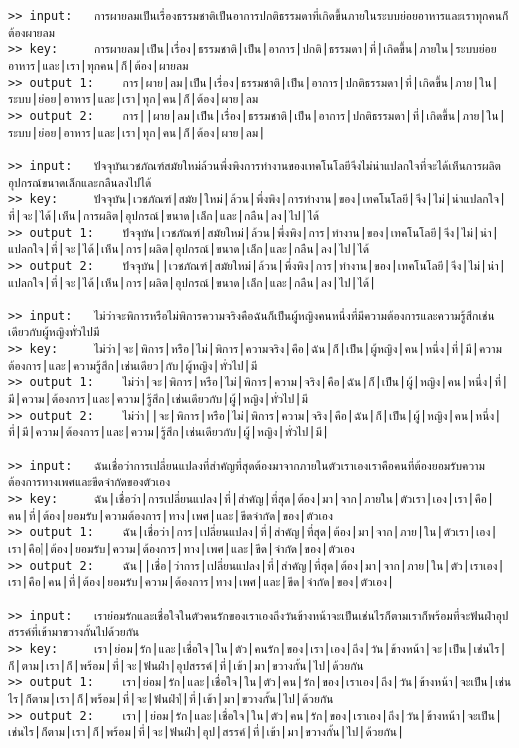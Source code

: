 \documentclass[11pt]{article}
\begin{document}
\begin{Verbatim}[commandchars=\\\{\}]
>> input:	การผายลมเป็นเรื่องธรรมชาติเป็นอาการปกติธรรมดาที่เกิดขึ้นภายในระบบย่อยอาหารและเราทุกคนก็ต้องผายลม
>> key:		การผายลม|เป็น|เรื่อง|ธรรมชาติ|เป็น|อาการ|ปกติ|ธรรมดา|ที่|เกิดขึ้น|ภายใน|ระบบย่อยอาหาร|และ|เรา|ทุกคน|ก็|ต้อง|ผายลม
>> output 1:	การ|ผาย|ลม|เป็น|เรื่อง|ธรรมชาติ|เป็น|อาการ|ปกติธรรมดา|ที่|เกิดขึ้น|ภาย|ใน|ระบบ|ย่อย|อาหาร|และ|เรา|ทุก|คน|ก็|ต้อง|ผาย|ลม
>> output 2:	การ||ผาย|ลม|เป็น|เรื่อง|ธรรมชาติ|เป็น|อาการ|ปกติธรรมดา|ที่|เกิดขึ้น|ภาย|ใน|ระบบ|ย่อย|อาหาร|และ|เรา|ทุก|คน|ก็|ต้อง|ผาย|ลม|

>> input:	ปัจจุบันเวชภัณฑ์สมัยใหม่ล้วนพึ่งพิงการทำงานของเทคโนโลยีจึงไม่น่าแปลกใจที่จะได้เห็นการผลิตอุปกรณ์ขนาดเล็กและกลืนลงไปได้
>> key:		ปัจจุบัน|เวชภัณฑ์|สมัย|ใหม่|ล้วน|พึ่งพิง|การทำงาน|ของ|เทคโนโลยี|จึง|ไม่|น่าแปลกใจ|ที่|จะ|ได้|เห็น|การผลิต|อุปกรณ์|ขนาด|เล็ก|และ|กลืน|ลง|ไป|ได้
>> output 1:	ปัจจุบัน|เวชภัณฑ์|สมัยใหม่|ล้วน|พึ่งพิง|การ|ทำงาน|ของ|เทคโนโลยี|จึง|ไม่|น่า|แปลกใจ|ที่|จะ|ได้|เห็น|การ|ผลิต|อุปกรณ์|ขนาด|เล็ก|และ|กลืน|ลง|ไป|ได้
>> output 2:	ปัจจุบัน||เวชภัณฑ์|สมัยใหม่|ล้วน|พึ่งพิง|การ|ทำงาน|ของ|เทคโนโลยี|จึง|ไม่|น่า|แปลกใจ|ที่|จะ|ได้|เห็น|การ|ผลิต|อุปกรณ์|ขนาด|เล็ก|และ|กลืน|ลง|ไป|ได้|

>> input:	ไม่ว่าจะพิการหรือไม่พิการความจริงคือฉันก็เป็นผู้หญิงคนหนึ่งที่มีความต้องการและความรู้สึกเช่นเดียวกับผู้หญิงทั่วไปมี
>> key:		ไม่ว่า|จะ|พิการ|หรือ|ไม่|พิการ|ความจริง|คือ|ฉัน|ก็|เป็น|ผู้หญิง|คน|หนึ่ง|ที่|มี|ความต้องการ|และ|ความรู้สึก|เช่นเดียว|กับ|ผู้หญิง|ทั่วไป|มี
>> output 1:	ไม่ว่า|จะ|พิการ|หรือ|ไม่|พิการ|ความ|จริง|คือ|ฉัน|ก็|เป็น|ผู้|หญิง|คน|หนึ่ง|ที่|มี|ความ|ต้องการ|และ|ความ|รู้สึก|เช่นเดียวกับ|ผู้|หญิง|ทั่วไป|มี
>> output 2:	ไม่ว่า||จะ|พิการ|หรือ|ไม่|พิการ|ความ|จริง|คือ|ฉัน|ก็|เป็น|ผู้|หญิง|คน|หนึ่ง|ที่|มี|ความ|ต้องการ|และ|ความ|รู้สึก|เช่นเดียวกับ|ผู้|หญิง|ทั่วไป|มี|

>> input:	ฉันเชื่อว่าการเปลี่ยนแปลงที่สำคัญที่สุดต้องมาจากภายในตัวเราเองเราคือคนที่ต้องยอมรับความต้องการทางเพศและขีดจำกัดของตัวเอง
>> key:		ฉัน|เชื่อว่า|การเปลี่ยนแปลง|ที่|สำคัญ|ที่สุด|ต้อง|มา|จาก|ภายใน|ตัวเรา|เอง|เรา|คือ|คน|ที่|ต้อง|ยอมรับ|ความต้องการ|ทาง|เพศ|และ|ขีดจำกัด|ของ|ตัวเอง
>> output 1:	ฉัน|เชื่อว่า|การ|เปลี่ยนแปลง|ที่|สำคัญ|ที่สุด|ต้อง|มา|จาก|ภาย|ใน|ตัวเรา|เอง|เรา|คือ|่|ต้อง|ยอมรับ|ความ|ต้องการ|ทาง|เพศ|และ|ขีด|จำกัด|ของ|ตัวเอง
>> output 2:	ฉัน||เชื่อ|ว่าการ|เปลี่ยนแปลง|ที่|สำคัญ|ที่สุด|ต้อง|มา|จาก|ภาย|ใน|ตัว|เราเอง|เรา|คือ|คน|ที่|ต้อง|ยอมรับ|ความ|ต้องการ|ทาง|เพศ|และ|ขีด|จำกัด|ของ|ตัวเอง|

>> input:	เราย่อมรักและเชื่อใจในตัวคนรักของเราเองถึงวันข้างหน้าจะเป็นเช่นไรก็ตามเราก็พร้อมที่จะฟันฝ่าอุปสรรค์ที่เข้ามาขวางกั้นไปด้วยกัน
>> key:		เรา|ย่อม|รัก|และ|เชื่อใจ|ใน|ตัว|คนรัก|ของ|เรา|เอง|ถึง|วัน|ข้างหน้า|จะ|เป็น|เช่นไร|ก็|ตาม|เรา|ก็|พร้อม|ที่|จะ|ฟันฝ่า|อุปสรรค์|ที่|เข้า|มา|ขวางกั้น|ไป|ด้วยกัน
>> output 1:	เรา|ย่อม|รัก|และ|เชื่อใจ|ใน|ตัว|คน|รัก|ของ|เราเอง|ถึง|วัน|ข้างหน้า|จะเป็น|เช่นไร|ก็ตาม|เรา|ก็|พร้อม|ที่|จะ|ฟันฝ่า|์|ที่|เข้า|มา|ขวางกั้น|ไป|ด้วยกัน
>> output 2:	เรา||ย่อม|รัก|และ|เชื่อใจ|ใน|ตัว|คน|รัก|ของ|เราเอง|ถึง|วัน|ข้างหน้า|จะเป็น|เช่นไร|ก็ตาม|เรา|ก็|พร้อม|ที่|จะ|ฟันฝ่า|อุป|สรรค์|ที่|เข้า|มา|ขวางกั้น|ไป|ด้วยกัน|


\end{Verbatim}
\end{document}
